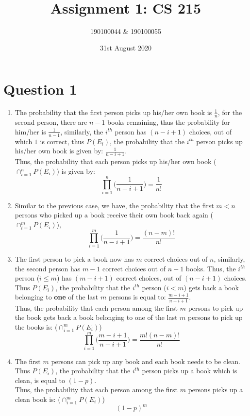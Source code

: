 \documentclass[11pt]{article}
\title{Assignment 1: CS 215}
\author{190100044 \& 190100055}
\date{31st August 2020}
\begin{document}
\maketitle
\tableofcontents
\thispagestyle{empty}

\newpage \setcounter{page}{1}
\section{Question 1}
\begin{enumerate}[label=(\alph*)]
    \item The probability that the first person picks up his/her own book is $\frac{1}{n}$, for the second person, there are $n-1$ books remaining, thus the probability for him/her is $\frac{1}{n-1}$, similarly, the $i^{th}$ person has $ (n-i+1) $ choices, out of which $1$ is correct, thus $P(E_i)$, the probability that the $i^{th}$ person picks up his/her own book is given by: $\frac{1}{n-i+1}$.\\
    Thus, the probability that each person picks up his/her own book ($ \cap_{i=1}^{n} P(E_i) $) is given by:
    $$ \prod_{i=1}^n \Big( \frac{1}{n-i+1} \Big) = \frac{1}{n!}$$
    
    \item Similar to the previous case, we have, the probability that the first $ m < n $ persons who picked up a book receive their own book back again ($ \cap_{i=1}^{m} P(E_i) $),
    $$ \prod_{i=1}^m \Big( \frac{1}{n-i+1} \Big) = \frac{(n-m)!}{n!} $$
    
    \item The first person to pick a book now has $m$ correct choices out of $n$, similarly, the second person has $m-1$ correct choices out of $n-1$ books. Thus, the $i^{th}$ person ($ i \le m $) has $ (m-i+1) $ correct choices, out of $(n-i+1)$ choices. Thus $P(E_i)$, the probability that the $i^{th}$ person ($i < m$) gets back a book belonging to \textbf{one} of the last $m$ persons is equal to: $\frac{m-i+1}{n-i+1}$.\\
    Thus, the probability that each person among the first $m$ persons to pick up the book gets back a book belonging to one of the last $m$ persons to pick up the books is: ($ \cap_{i=1}^{m} P(E_i) $)
    $$ \prod_{i=1}^m \Big( \frac{m-i+1}{n-i+1} \Big) = \frac{m!(n-m)!}{n!} $$
    
    \item The first $m$ persons can pick up any book and each book needs to be clean. Thus $P(E_i)$, the probability that the $i^{th}$ person picks up a book which is clean, is equal to $(1-p)$.\\
    Thus, the probability that each person among the first $m$ persons picks up a clean book is: ($ \cap_{i=1}^{m} P(E_i) $)
    $$ (1-p)^m $$
    

\end{enumerate}
\end{document}
